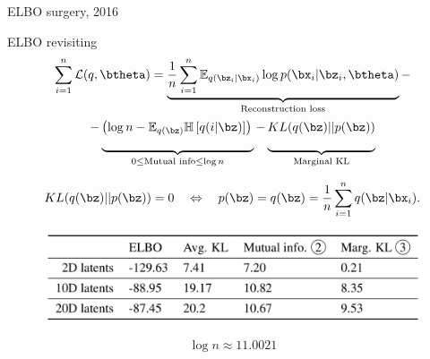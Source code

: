 \begin{frame}{ELBO surgery, 2016}
	\begin{block}{ELBO revisiting}
	\vspace{-0.7cm}
	{\footnotesize
	\begin{multline*}
	    \sum_{i=1}^n \mathcal{L}(q, \btheta) = \underbrace{\frac{1}{n} \sum_{i=1}^n \mathbb{E}_{q(\bz_i | \bx_i)} \log p(\bx_i | \bz_i, \btheta)}_{\text{Reconstruction loss}} - \\
	    - \underbrace{\left(\log n - \mathbb{E}_{q(\bz)} \mathbb{H} \left[ q(i | \bz) \right] \right)\vphantom{\sum_{i=1}}}_{0 \leq \text{Mutual info} \leq \log n } - \underbrace{KL(q(\bz) || p(\bz))\vphantom{\sum_{i=1}}}_{\text{Marginal KL}}
	\end{multline*}}
	\end{block}
	\vspace{-0.8cm}
	\[
	    KL(q(\bz) || p(\bz)) = 0 \quad \Leftrightarrow \quad p (\bz) = q(\bz) = \frac{1}{n} \sum_{i=1}^n q(\bz | \bx_i).
	\]
	\vspace{-0.3cm}
	\begin{figure}
	    \centering
	    \includegraphics[width=0.7\linewidth]{figs/ELBO_surgery.png}
	\end{figure}
	\vspace{-0.3cm}
	\[
	\log n \approx 11.0021
	\]
\end{frame}
